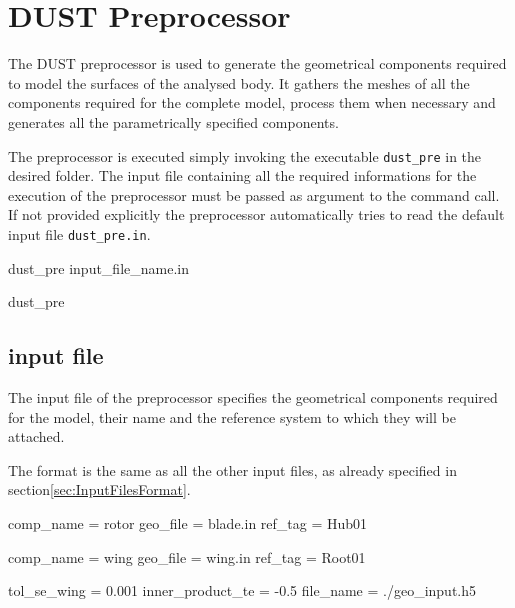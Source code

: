 \chapter{DUST Preprocessor}
\label{ch:Pre}

The DUST preprocessor is used to generate the geometrical components required to model the surfaces of the analysed body. It gathers the meshes of all the components required for the complete model, process them when necessary and generates all the parametrically specified components. 

The preprocessor is executed simply invoking the executable \texttt{dust\_pre} in the desired folder. The input file containing all the required informations for the execution of the preprocessor must be passed as argument to the command call. If not provided explicitly the preprocessor automatically tries to read the default input file \texttt{dust\_pre.in}.
\begin{command}[caption={Preprocessor command looking for input file \texttt{input\_file\_name.in}}]
 dust_pre input_file_name.in
\end{command}

\begin{command}[caption={Preprocessor command looking for 
default input file \texttt{dust\_pre.in}}, label={command:dus_pre_default}]
 dust_pre
\end{command}


\section{input file}
\label{sec:Pre_InputFile}

The input file of the preprocessor specifies the geometrical components required for the model, their name and the reference system to which they will be attached.

The format is the same as all the other input files, as already specified in section\ref{sec:InputFilesFormat}.

\begin{inputfile}[frame=single, caption={dust_pre.in}, label={file:dust_pre.in}]
comp_name = rotor
geo_file  = blade.in
ref_tag   = Hub01

comp_name = wing
geo_file  = wing.in
ref_tag   = Root01

tol_se_wing  = 0.001
inner_product_te = -0.5
file_name = ./geo_input.h5 
\end{inputfile}

